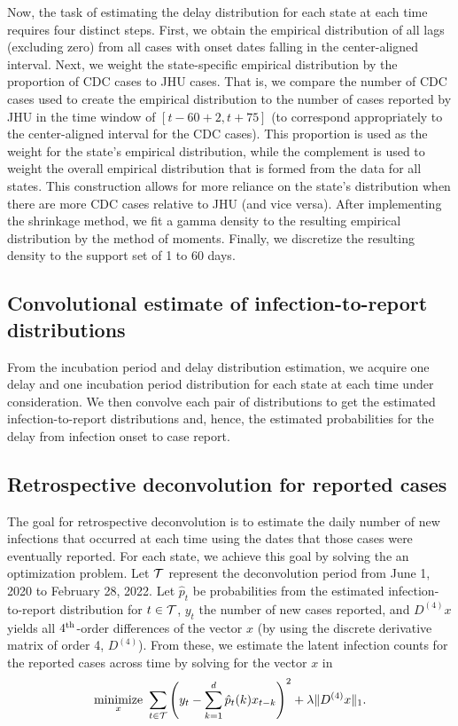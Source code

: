 \documentclass{article}
\begin{document}
Now, the task of estimating the delay distribution for each state at each time
requires four distinct steps. First, we obtain the empirical
distribution of all lags (excluding zero) from all cases with onset dates
falling in the center-aligned interval. Next, we weight the state-specific
empirical distribution by the proportion of CDC cases to JHU cases. That is, we
compare the number of CDC cases used to create the empirical distribution to the
number of cases reported by JHU in the time window of $\left[t - 60 + 2, t +
75\right]$ (to correspond appropriately to the center-aligned interval for
the CDC cases). This proportion is used as the weight for the state's empirical
distribution, while the complement is used to weight the overall empirical
distribution that is formed from the data for all states. This construction
allows for more reliance on the state's distribution when there are more CDC
cases relative to JHU (and vice versa). After implementing the shrinkage method,
we fit a gamma density to the resulting empirical distribution by the method of
moments. Finally, we discretize the resulting density to the support set of 1
to 60 days.
 
\subsection{Convolutional estimate of infection-to-report distributions} 

From the incubation period and delay distribution estimation, we acquire one
delay and one incubation period distribution for each state at each time under
consideration. We then convolve each pair of distributions to get the estimated
infection-to-report distributions and, hence, the estimated probabilities for
the delay from infection onset to case report. 

\subsection{Retrospective deconvolution for reported cases}

The goal for retrospective deconvolution is to estimate the daily number of new
infections that occurred at each time using the dates that those cases were eventually
reported. For each state, we
achieve this goal by solving the an optimization problem. 
Let $\mathcal{T}$ represent the deconvolution period from June
1, 2020 to February 28, 2022. Let $\hat{p}_t$ be probabilities from the estimated
infection-to-report distribution for $t \in \mathcal{T}$, $y_t$ the number of new cases
reported, and $D^{(4)}x$ yields all $4^{\textnormal{th}}$-order differences of the vector $x$
(by using the discrete derivative matrix of order 4, $D^{(4)}$). From these,
we estimate the latent infection counts for the reported cases across time by
solving for the vector $x$ in
\begin{align*}
\operatorname*{minimize}_{x}\ \sum_{t \in \mathcal{T}} \left ( y_t -  \sum_{k = 1}^{d} \hat{p}_t(k)x_{t-k} 
\right )^2 + \lambda \|D^{(4)}x\|_1. 
\end{align*}
\end{document}
